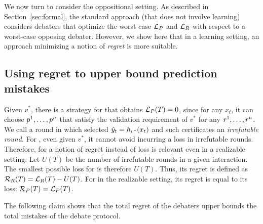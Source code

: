 \documentclass[anon]{alt2027} %
\begin{document}
We now turn to consider the oppositional setting. As described in Section~\ref{sec:formal}, the standard approach (that does not involve learning) considers debaters that optimize the worst case ${{\mathcal L}_P}$ and ${{\mathcal L}_R}$ with respect to a worst-case opposing debater. However, we show here that in a learning setting, an approach minimizing a notion of \emph{regret} is more suitable. 

\subsection{Using regret to upper bound prediction mistakes}

Given $v^*$, there is a strategy for \dt that obtains ${{\mathcal L}_P}(T) = 0$, since for any $x_t$, it can choose ${p}^1,\ldots,{p}^n$ that satisfy the validation requirement of $v^*$ for any ${r}^1,\ldots,{r}^n$. We call a round in which \dt selected ${\hat{y}}_t  = h_{v^*}(x_t)$ and such certificates an \emph{irrefutable round}. For \df, even given $v^*$, it cannot avoid incurring a loss in irrefutable rounds. Therefore, for \df a notion of regret instead of loss is relevant even in a realizable setting: Let $U(T)$ be the number of irrefutable rounds in a given interaction. The smallest possible loss for \df is therefore $U(T)$. Thus, its regret is defined as ${{\mathcal R}_R}(T) = {{\mathcal L}_R}(T) - U(T)$. For \dt in the realizable setting, its regret is equal to its loss: 
${{\mathcal R}_P}(T) = {{\mathcal L}_P}(T)$. 


The following claim shows that the total regret of the debaters upper bounds the total mistakes of the debate protocol. 









\end{document}
